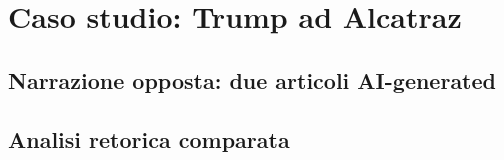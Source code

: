 \chapter{Caso studio: Trump ad Alcatraz}

\section{Narrazione opposta: due articoli AI-generated}

\section{Analisi retorica comparata}